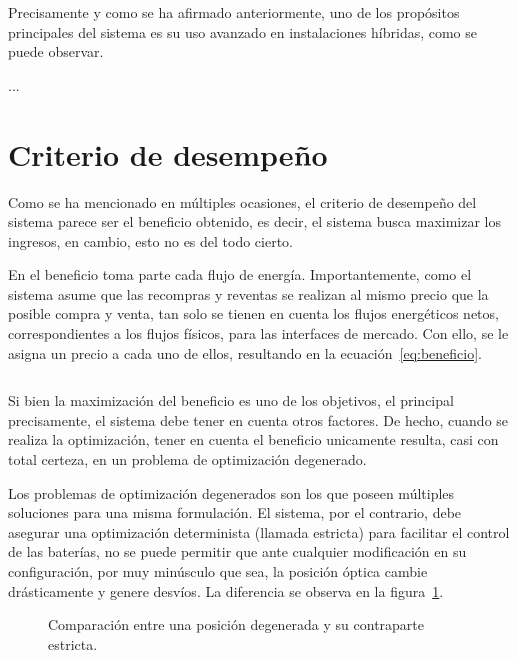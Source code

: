 Precisamente y como se ha afirmado anteriormente, uno de los propósitos principales del sistema es su uso avanzado en instalaciones híbridas, como se puede observar.

...

\section{Criterio de desempeño}
\label{makereference5.4}

Como se ha mencionado en múltiples ocasiones, el criterio de desempeño del sistema parece ser el beneficio obtenido, es decir, el sistema busca maximizar los ingresos, en cambio, esto no es del todo cierto.

En el beneficio toma parte cada flujo de energía. Importantemente, como el sistema asume que las recompras y reventas se realizan al mismo precio que la posible compra y venta, tan solo se tienen en cuenta los flujos energéticos netos, correspondientes a los flujos físicos, para las interfaces de mercado. Con ello, se le asigna un precio a cada uno de ellos, resultando en la ecuación~\ref{eq:beneficio}.

\begin{equation}
  \label{eq:beneficio}
\end{equation}

Si bien la maximización del beneficio es uno de los objetivos, el principal precisamente, el sistema debe tener en cuenta otros factores. De hecho, cuando se realiza la optimización, tener en cuenta el beneficio unicamente resulta, casi con total certeza, en un problema de optimización degenerado.

Los problemas de optimización degenerados son los que poseen múltiples soluciones para una misma formulación. El sistema, por el contrario, debe asegurar una optimización determinista (llamada estricta) para facilitar el control de las baterías, no se puede permitir que ante cualquier modificación en su configuración, por muy minúsculo que sea, la posición óptica cambie drásticamente y genere desvíos. La diferencia se observa en la figura~\ref{fig:degenerada-vs-estricta}.

\begin{figure}
  \centering
  \caption[Comparación entre una posición degenerada y estricta.]{Comparación entre una posición degenerada y su contraparte estricta.}
  \label{fig:degenerada-vs-estricta}
\end{figure}

